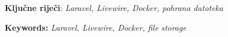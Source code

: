 \documentclass[12pt, a4paper]{article}
\begin{document}



\noindent\textbf{Ključne riječi}: \textit{Laravel, Livewire, Docker, pohrana datoteka}



\noindent\textbf{Keywords:} \textit{Laravel, Livewire, Docker, file storage}

\newpage
{}


\newpage


\newpage


\newpage


\newpage
{}



\newpage
\clearpage
\pagestyle{empty}
\end{document}
